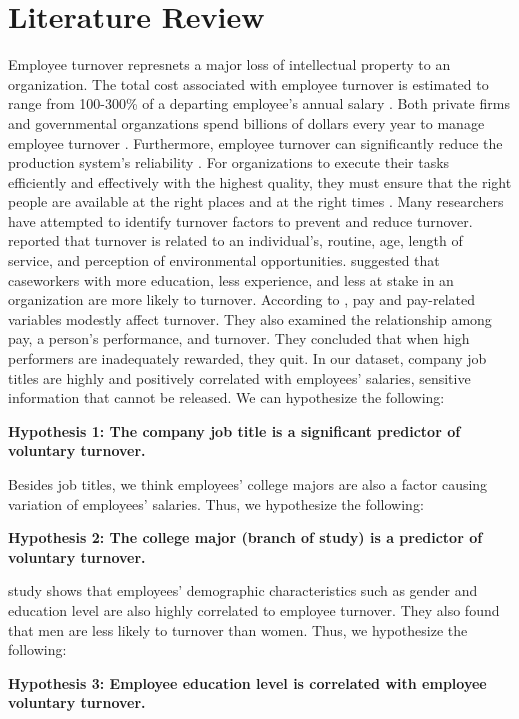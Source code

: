 \section{Literature Review}
Employee turnover represnets a major loss of intellectual property to an organization. The total cost associated with employee turnover is estimated to range from 100-300\% of a departing employee’s annual salary \citep{Moody2000}. Both private firms and governmental organzations spend billions of dollars every year to manage employee turnover \citep{leonard2001}. Furthermore, employee turnover can significantly reduce the production system’s reliability \citep{ahmad2014, sawhney2010}. For organizations to execute their tasks efficiently and effectively with the highest quality, they must ensure that the right people are available at the right places and at the right times \citep{khoong1996}. 
Many researchers have attempted to identify turnover factors to prevent and reduce turnover. \citet{bluedorn1982} reported that turnover is related to an individual’s, routine, age, length of service, and perception of environmental opportunities. \citet{balfour1993} suggested that caseworkers with more education, less experience, and less at stake in an organization are more likely to turnover. According to \citet{griffeth2000}, pay and pay-related variables modestly affect turnover. They also examined the relationship among pay, a person’s performance, and turnover. They concluded that when high performers are inadequately rewarded, they quit. In our dataset, company job titles are highly and positively correlated with employees’ salaries, sensitive information that cannot be released. We can hypothesize the following:

\textbf{Hypothesis 1: The company job title is a significant predictor of voluntary turnover.}

Besides job titles, we think employees’ college majors are also a factor causing variation of employees’ salaries. Thus, we hypothesize the following:

\textbf{Hypothesis 2: The college major (branch of study) is a predictor of voluntary turnover. }

\citet{griffeth2000} study shows that employees’ demographic characteristics such as gender and education level are also highly correlated to employee turnover. They also found that men are less likely to turnover than women. Thus, we hypothesize the following:

\textbf{Hypothesis 3: Employee education level is correlated with employee voluntary turnover.}


